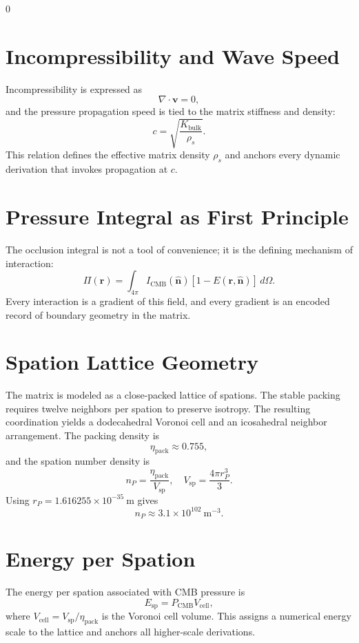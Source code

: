 0\documentclass[12pt]{book}
\begin{document}
\section{Incompressibility and Wave Speed}
Incompressibility is expressed as
\begin{equation}
\nabla \cdot \mathbf{v} = 0,
\end{equation}
and the pressure propagation speed is tied to the matrix stiffness and density:
\begin{equation}
c = \sqrt{\frac{K_{\text{bulk}}}{\rho_s}}.
\end{equation}
This relation defines the effective matrix density $\rho_s$ and anchors every dynamic derivation that
invokes propagation at $c$.

\section{Pressure Integral as First Principle}
The occlusion integral is not a tool of convenience; it is the defining mechanism of interaction:
\begin{equation}
\Pi(\mathbf{r}) = \int_{4\pi} I_{\text{CMB}}(\hat{\mathbf{n}})\left[1 - E(\mathbf{r},\hat{\mathbf{n}})\right]\, d\Omega.
\end{equation}
Every interaction is a gradient of this field, and every gradient is an encoded record of boundary
geometry in the matrix.
\section{Spation Lattice Geometry}
The matrix is modeled as a close-packed lattice of spations. The stable packing requires twelve neighbors per spation to preserve isotropy. The resulting coordination yields a dodecahedral Voronoi
cell and an icosahedral neighbor arrangement. The packing density is
\begin{equation}
\eta_{\text{pack}} \approx 0.755,
\end{equation}
and the spation number density is
\begin{equation}
n_P = \frac{\eta_{\text{pack}}}{V_{\text{sp}}},\quad V_{\text{sp}} = \frac{4\pi r_P^3}{3}.
\end{equation}
Using $r_P = 1.616255 \times 10^{-35}\ \text{m}$ gives
\begin{equation}
n_P \approx 3.1 \times 10^{102}\ \text{m}^{-3}.
\end{equation}

\section{Energy per Spation}
The energy per spation associated with CMB pressure is
\begin{equation}
E_{\text{sp}} = P_{\text{CMB}} V_{\text{cell}},
\end{equation}
where $V_{\text{cell}} = V_{\text{sp}}/\eta_{\text{pack}}$ is the Voronoi cell volume. This assigns a
numerical energy scale to the lattice and anchors all higher-scale derivations.
\end{document}
